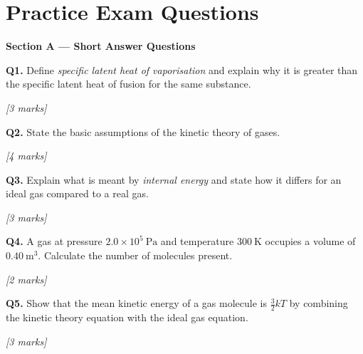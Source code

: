 \section{Practice Exam Questions}

{\bfseries\color{midblue}\large Section A --- Short Answer Questions}

\medskip

\begin{tcolorbox}[colback=white, colframe=midblue, breakable]

\begin{minipage}{\linewidth}
\textbf{Q1.} Define \textit{specific latent heat of vaporisation} and explain why it is greater than the specific latent heat of fusion for the same substance.
\par\hfill\textit{[3 marks]}
\vspace{3cm}
\end{minipage}

\begin{minipage}{\linewidth}
\textbf{Q2.} State the basic assumptions of the kinetic theory of gases.
\par\hfill\textit{[4 marks]}
\vspace{4cm}
\end{minipage}

\begin{minipage}{\linewidth}
\textbf{Q3.} Explain what is meant by \textit{internal energy} and state how it differs for an ideal gas compared to a real gas.
\par\hfill\textit{[3 marks]}
\vspace{3cm}
\end{minipage}

\begin{minipage}{\linewidth}
\textbf{Q4.} A gas at pressure $2.0\times10^5\ \text{Pa}$ and temperature $300\ \text{K}$ occupies a volume of $0.40\ \text{m}^3$. Calculate the number of molecules present.
\par\hfill\textit{[2 marks]}
\vspace{3cm}
\end{minipage}

\begin{minipage}{\linewidth}
\textbf{Q5.} Show that the mean kinetic energy of a gas molecule is $\frac{3}{2}kT$ by combining the kinetic theory equation with the ideal gas equation.
\par\hfill\textit{[3 marks]}
\vspace{4cm}
\end{minipage}

\end{tcolorbox}

